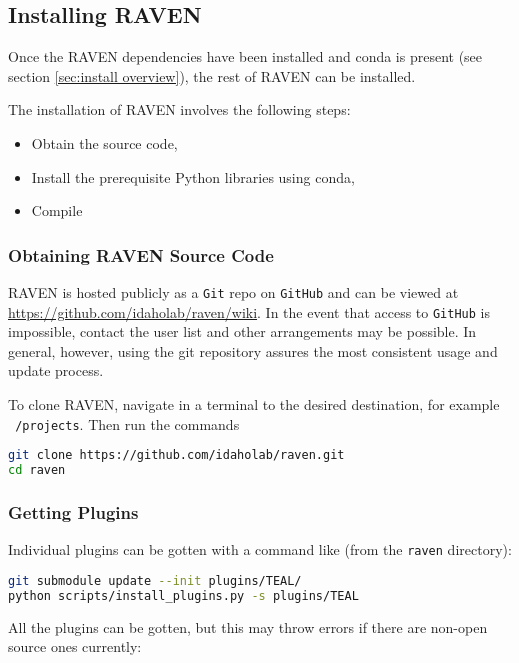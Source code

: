\subsection{Installing RAVEN}
\label{sec:clone raven}

Once the RAVEN dependencies have been installed  and conda is present
(see section \ref{sec:install overview}), the rest of RAVEN can be installed.

The installation of RAVEN involves the following steps:
\begin{itemize}
  \item Obtain the source code,
  \item Install the prerequisite Python libraries using conda,
  \item Compile
\end{itemize}




\subsubsection{Obtaining RAVEN Source Code}
RAVEN is hosted publicly as a \texttt{Git} repo on \texttt{GitHub}
and can be viewed at \url{https://github.com/idaholab/raven/wiki}.
In the event that access to \texttt{GitHub} is impossible, contact the user list and other arrangements may be
possible.  In general, however, using the git repository assures the most consistent usage and update process.

To clone RAVEN, navigate in a terminal to the desired destination, for example \texttt{~/projects}.  Then run
the commands
\begin{lstlisting}[language=bash]
git clone https://github.com/idaholab/raven.git
cd raven
\end{lstlisting}

\subsubsection{Getting Plugins}

Individual plugins can be gotten with a command like (from the
\texttt{raven} directory):

\begin{lstlisting}[language=bash]
git submodule update --init plugins/TEAL/
python scripts/install_plugins.py -s plugins/TEAL
\end{lstlisting}

All the plugins can be gotten, but this may throw errors if there are non-open source ones currently:

